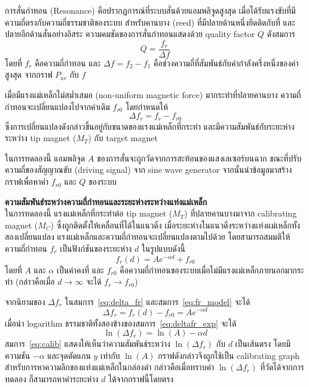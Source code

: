 \documentclass[11pt,a4paper]{article}
\begin{document}
การสั่นกำทอน (Resonance) คือปรากฏการณ์ที่ระบบสั่นด้วยแอมพลิจูดสูงสุด 
เมื่อได้รับแรงขับที่มีความถี่ตรงกับความถี่ธรรมชาติของระบบ 
สำหรับคานบาง (reed) ที่มีปลายด้านหนึ่งยึดติดกับที่ และปลายอีกด้านสั่นอย่างอิสระ 
ความคมชัดของการสั่นกำทอนแสดงด้วย quality factor $Q$ ดังสมการ \cite{halliday,serway}
\begin{equation}
    Q = \frac{f_r}{\Delta f} \label{eq:Q_factor}
\end{equation} 
โดยที่ $f_r$ คือความถี่กำทอน และ $\Delta f = f_2 - f_1$ คือช่วงความถี่ที่สัมพันธ์กับค่ากำลังครึ่งหนึ่งของค่าสูงสุด
จากกราฟ $P_{av}$ กับ $f$

เมื่อมีแรงแม่เหล็กไม่สม่ำเสมอ (non-uniform magnetic force) มากระทำที่ปลายคานบาง 
ความถี่กำทอนจะเปลี่ยนแปลงไปจากค่าเดิม $f_{r0}$ โดยกำหนดให้
\begin{equation}
    \Delta f_r = f_r - f_{r0} \label{eq:delta_fr}
\end{equation}
ซึ่งการเปลี่ยนแปลงดังกล่าวขึ้นอยู่กับขนาดของแรงแม่เหล็กที่กระทำ 
และมีความสัมพันธ์กับระยะห่างระหว่าง tip magnet ($M_T$) กับ target magnet

ในการทดลองนี้ แอมพลิจูด $A$ ของการสั่นจะถูกวัดจากการสะท้อนของแสงเลเซอร์บนฉาก 
ขณะที่ปรับความถี่ของสัญญาณขับ (driving signal) จาก sine wave generator 
จากนั้นนำข้อมูลมาสร้างกราฟเพื่อหาค่า $f_{r0}$ และ $Q$ ของระบบ

\bigskip
\noindent
\bigskip
\noindent
\textbf{ความสัมพันธ์ระหว่างความถี่กำทอนและระยะห่างระหว่างแท่งแม่เหล็ก} \\

ในการทดลองนี้ แรงแม่เหล็กที่กระทำต่อ tip magnet ($M_T$) ที่ปลายคานบางมาจาก
calibrating magnet ($M_C$) ซึ่งถูกติดตั้งให้เคลื่อนที่ได้ในแนวดิ่ง
เมื่อระยะห่างในแนวดิ่งระหว่างแท่งแม่เหล็กทั้งสองเปลี่ยนแปลง
แรงแม่เหล็กและความถี่กำทอนจะเปลี่ยนแปลงตามไปด้วย
โดยสามารถสมมติให้ความถี่กำทอน $f_r$ เป็นฟังก์ชันของระยะห่าง $d$ ในรูปแบบดังนี้ \cite{labmanual}
\begin{equation}
    f_r(d) = A e^{-\alpha d} + f_{r0} \label{eq:fr_model}
\end{equation}
โดยที่ $A$ และ $\alpha$ เป็นค่าคงที่ และ $f_{r0}$ คือความถี่กำทอนของระบบเมื่อไม่มีแรงแม่เหล็กภายนอกมากระทำ
(กล่าวคือเมื่อ $d \to \infty$ จะได้ $f_r \to f_{r0}$)

จากนิยามของ $\Delta f_r$ ในสมการ~\eqref{eq:delta_fr} และสมการ~\eqref{eq:fr_model} จะได้
\begin{equation}
    \Delta f_r = f_r(d) - f_{r0} = A e^{-\alpha d} \label{eq:deltafr_exp}
\end{equation}
เมื่อนำ logarithm ธรรมชาติทั้งสองข้างของสมการ~\eqref{eq:deltafr_exp} จะได้ \cite{labmanual}
\begin{equation}
    \ln(\Delta f_r) = \ln(A) - \alpha d \label{eq:calib}
\end{equation}
สมการ~\eqref{eq:calib} แสดงให้เห็นว่าความสัมพันธ์ระหว่าง $\ln(\Delta f_r)$ กับ $d$ เป็นเส้นตรง
โดยมีความชัน $-\alpha$ และจุดตัดแกน $y$ เท่ากับ $\ln(A)$
กราฟดังกล่าวจึงถูกใช้เป็น calibrating graph สำหรับการหาความลึกของแท่งแม่เหล็กในกล่องดำ
กล่าวคือเมื่อทราบค่า $\ln(\Delta f_r)$ ที่วัดได้จากการทดลอง
ก็สามารถหาค่าระยะห่าง $d$ ได้จากกราฟนี้โดยตรง
\end{document}
